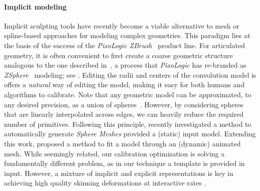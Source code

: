 \paragraph{Implicit modeling}
Implicit sculpting tools have recently become a viable alternative to mesh or spline-based approaches for modeling complex geometries. This paradigm lies at the basis of the success of the \emph{PixoLogic ZBrush~\textcopyright} product line. 
For articulated geometry, it is often convenient to first create a coarse geometric structure analogous to the one described in~, a process that \emph{PixoLogic} has re-branded as \emph{ZSphere~{\textcopyright}} modeling; see . Editing the radii and centers of the convolution model is offers a \emph{natural} way of editing the model, making it easy for both humans and algorithms to calibrate.
Note that any geometric model can be approximated, to any desired precision, as a union of spheres~\cite{tagliasacchi2016skeletons}. 
However, by considering spheres that are linearly interpolated across edges, we can heavily reduce the required number of primitives. Following this principle, \cite{thiery2013sphere} recently investigated a method to automatically generate \emph{Sphere Meshes} provided a  (static) input model. Extending this work, \cite{thiery2016spheremesh} proposed a method to fit a model through an (dynamic) animated mesh. While seemingly related, our calibration optimization is solving a fundamentally different problem, as in our technique a template is provided in input. However, a mixture of implicit and explicit representations is key in achieving high quality skinning deformations at interactive rates \cite{vaillant2013implicit,vaillant2014robust}.

\endinput



